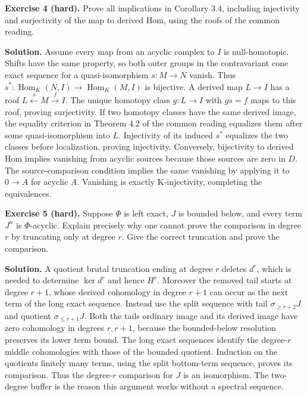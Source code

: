 \documentclass[
  english,
  11pt,
  a4paper,
]{article}
\begin{document}
\textbf{Exercise 4 (hard).} Prove all implications in Corollary 3.4,
including injectivity and surjectivity of the map to derived Hom, using
the roofs of the common reading.

\textbf{Solution.} Assume every map from an acyclic complex to \(I\) is
null-homotopic. Shifts have the same property, so both outer groups in
the contravariant cone exact sequence for a quasi-isomorphism
\(s:M\to N\) vanish. Thus
\(s^*:\operatorname{Hom}_K(N,I)\to\operatorname{Hom}_K(M,I)\) is
bijective. A derived map \(L\to I\) has a roof
\(L\xleftarrow{s}M\xrightarrow{f}I\). The unique homotopy class
\(g:L\to I\) with \(gs=f\) maps to this roof, proving surjectivity. If
two homotopy classes have the same derived image, the equality criterion
in Theorem 4.2 of the common reading equalizes them after some
quasi-isomorphism into \(L\). Injectivity of its induced \(s^*\)
equalizes the two classes before localization, proving injectivity.
Conversely, bijectivity to derived Hom implies vanishing from acyclic
sources because those sources are zero in \(D\). The source-comparison
condition implies the same vanishing by applying it to \(0\to A\) for
acyclic \(A\). Vanishing is exactly K-injectivity, completing the
equivalences.

\textbf{Exercise 5 (hard).} Suppose \(\Phi\) is left exact, \(J\) is
bounded below, and every term \(J^n\) is \(\Phi\)-acyclic. Explain
precisely why one cannot prove the comparison in degree \(r\) by
truncating only at degree \(r\). Give the correct truncation and prove
the comparison.

\textbf{Solution.} A quotient brutal truncation ending at degree \(r\)
deletes \(d^r\), which is needed to determine \(\ker d^r\) and hence
\(H^r\). Moreover the removed tail starts at degree \(r+1\), whose
derived cohomology in degree \(r+1\) can occur as the next term of the
long exact sequence. Instead use the split sequence with tail
\(\sigma_{\ge r+2}J\) and quotient \(\sigma_{\le r+1}J\). Both the
tail\textquotesingle s ordinary image and its derived image have zero
cohomology in degrees \(r,r+1\), because the bounded-below resolution
preserves its lower term bound. The long exact sequences identify the
degree-\(r\) middle cohomologies with those of the bounded quotient.
Induction on the quotient\textquotesingle s finitely many terms, using
the split bottom-term sequence, proves its comparison. Thus the
degree-\(r\) comparison for \(J\) is an isomorphism. The two-degree
buffer is the reason this argument works without a spectral sequence.
\end{document}
